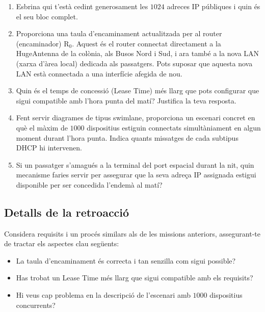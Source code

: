 \begin{enumerate}[itemsep=0.1cm]
\item Esbrina qui t'està cedint generosament les $1024$ adreces IP públiques i quin és el seu bloc complet.

\item Proporciona una taula d'encaminament actualitzada per al router (encaminador) $\textrm{R}_0$. Aquest és el router connectat directament a la \mbox{HugeAntenna\texttrademark} de la colònia, als Busos Nord i Sud, i ara també a la nova LAN (xarxa d'àrea local) dedicada als passatgers. Pots suposar que aquesta nova LAN està connectada a una interfície afegida de nou.

\item Quin és el temps de concessió (Lease Time) més llarg que pots configurar que sigui compatible amb l'hora punta del matí? Justifica la teva resposta.

\item Fent servir diagrames de tipus swimlane, proporciona un escenari concret en què el màxim de $1000$ dispositius estiguin connectats simultàniament en algun moment durant l'hora punta. Indica quants missatges de cada subtipus DHCP hi intervenen.

\item Si un passatger s'amagués a la terminal del port espacial durant la nit, quin mecanisme faries servir per assegurar que la seva adreça IP assignada estigui disponible per ser concedida l'endemà al matí?

\end{enumerate}


\subsection*{Detalls de la retroacció}

Considera requisits i un procés similars als de les missions anteriors, assegurant-te de tractar els aspectes clau següents:
\begin{itemize}
\item La taula d'encaminament és correcta i tan senzilla com sigui possible?
\item Has trobat un Lease Time més llarg que sigui compatible amb els requisits?
\item Hi veus cap problema en la descripció de l'escenari amb $1000$ dispositius concurrents?
\end{itemize}
